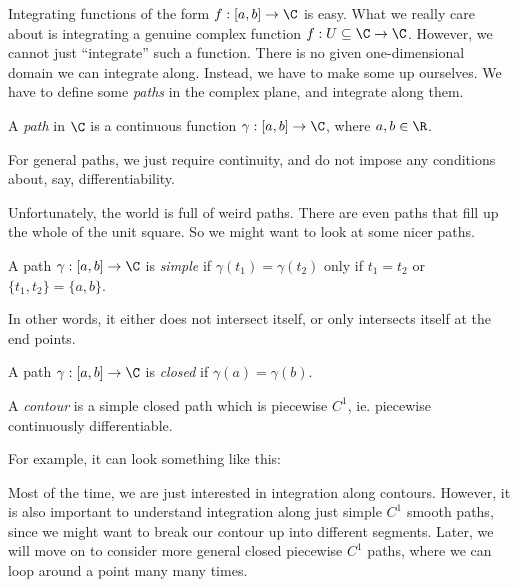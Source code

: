 \documentclass[a4paper]{article}
\begin{document}
Integrating functions of the form $f: [a, b] \to \C$ is easy. What we really care about is integrating a genuine complex function $f: U \subseteq \C \to \C$. However, we cannot just ``integrate'' such a function. There is no given one-dimensional domain we can integrate along. Instead, we have to make some up ourselves. We have to define some \emph{paths} in the complex plane, and integrate along them.

\begin{defi}[Path]
  A \emph{path} in $\C$ is a continuous function $\gamma: [a, b] \to \C$, where $a, b\in \R$.
\end{defi}
For general paths, we just require continuity, and do not impose any conditions about, say, differentiability.

Unfortunately, the world is full of weird paths. There are even paths that fill up the whole of the unit square. So we might want to look at some nicer paths.

\begin{defi}
  A path $\gamma: [a, b] \to \C$ is \emph{simple} if $\gamma(t_1) = \gamma(t_2)$ only if $t_1 = t_2$ or $\{t_1, t_2\} = \{a, b\}$.
\end{defi}
In other words, it either does not intersect itself, or only intersects itself at the end points.

\begin{defi}
  A path $\gamma: [a, b] \to \C$ is \emph{closed} if $\gamma(a) = \gamma(b)$.
\end{defi}

\begin{defi}[Contour]
  A \emph{contour} is a simple closed path which is piecewise $C^1$, ie. piecewise continuously differentiable.
\end{defi}

For example, it can look something like this:
\begin{center}
\end{center}
Most of the time, we are just interested in integration along contours. However, it is also important to understand integration along just simple $C^1$ smooth paths, since we might want to break our contour up into different segments. Later, we will move on to consider more general closed piecewise $C^1$ paths, where we can loop around a point many many times.
\end{document}
